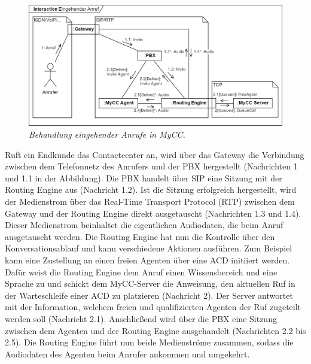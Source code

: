 \begin{figure} %
	\centering
		\includegraphics[width=\textwidth]{img/RoutingEngineSipExplanation.png}
	\caption[Behandlung eingehender Rufe in MyCC]{\textit{Behandlung eingehender Anrufe in MyCC.}}
	\label{fig:InteractionIncomingCall}
\end{figure}
\noindent Ruft ein Endkunde das Contactcenter an, wird über das Gateway die Verbindung zwischen dem Telefonnetz des Anrufers und der PBX hergestellt (Nachrichten 1 und 1.1 in der Abbildung). Die PBX handelt über SIP eine Sitzung mit der Routing Engine aus (Nachricht 1.2). Ist die Sitzung erfolgreich hergestellt, wird der Medienstrom über das Real-Time Transport Protocol (RTP) zwischen dem Gateway und der Routing Engine direkt ausgetauscht (Nachrichten 1.3 und 1.4). Dieser Medienstrom beinhaltet die eigentlichen Audiodaten, die beim Anruf ausgetauscht werden. Die Routing Engine hat nun die Kontrolle über den Konversationsablauf und kann verschiedene Aktionen ausführen. Zum Beispiel kann eine Zustellung an einen freien Agenten über eine ACD initiiert werden. Dafür weist die Routing Engine dem Anruf einen Wissensbereich und eine Sprache zu und schickt dem MyCC-Server die Anweisung, den aktuellen Ruf in der Warteschleife einer ACD zu platzieren (Nachricht 2). Der Server antwortet mit der Information, welchem freien und qualifizierten Agenten der Ruf zugeteilt werden soll (Nachricht 2.1). Anschließend wird über die PBX eine Sitzung zwischen dem Agenten und der Routing Engine ausgehandelt (Nachrichten 2.2 bis 2.5). Die Routing Engine führt nun beide Medienströme zusammen, sodass die Audiodaten des Agenten beim Anrufer ankommen und umgekehrt. 
\newline
